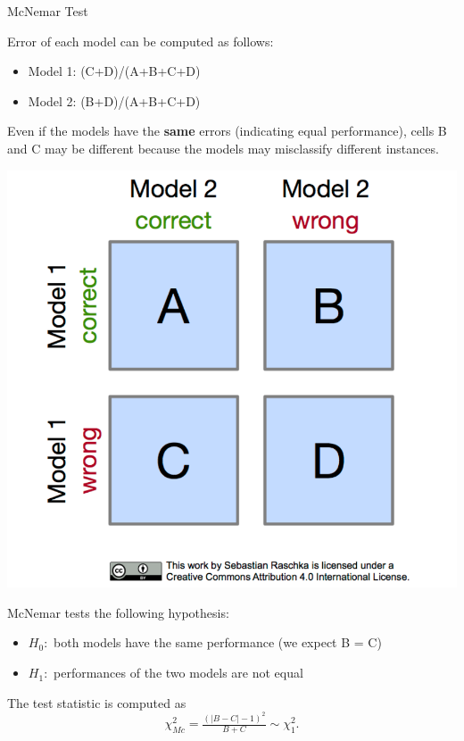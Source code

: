 \begin{frame}[c,allowframebreaks]{McNemar Test}
    \framebreak

    \begin{minipage}[c]{0.74\linewidth}
    Error of each model can be computed as follows:
    \begin{itemize}
      \item Model 1: (C+D)/(A+B+C+D)
      \item Model 2: (B+D)/(A+B+C+D)
    \end{itemize}

    Even if the models have the \textbf{same} errors (indicating equal performance), cells B and C may be different because the models may misclassify different instances.
    \end{minipage}
    \begin{minipage}[c]{0.25\linewidth}
        \includegraphics[width=\textwidth]{mcnemar_1.png}
    \end{minipage}

    \medskip

    McNemar tests the following hypothesis:
    \begin{itemize}
    \item $H_0:$ both models have the same performance (we expect B = C)
    \item $H_1:$ performances of the two models are not equal
    \end{itemize}

    The test statistic is computed as
    $$\chi^2_{Mc} =  \tfrac{(|B-C| - 1)^2}{B + C} \sim \chi^2_{1}.$$


\end{frame}
